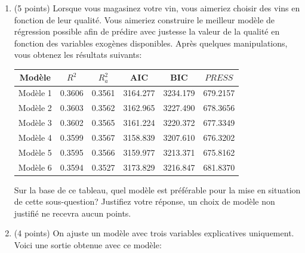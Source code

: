 \documentclass[11pt]{article}
\begin{document}
{\begin{enumerate}
\begin{enumerate}
    \begin{enumerate}
        \item Est-ce que cette observation fait augmenter ou diminuer la variance du vecteur de coefficients de régression estimés?\vspace{2.5in}
        \item Est-ce que la présence de cette observation fait augmenter ou diminuer la valeur de sa propre prédiction? Quantifiez cette augmentation ou diminution.\vspace{2in}
    \end{enumerate}
    \newpage
    \item (5 points) Lorsque vous magasinez votre vin, vous aimeriez choisir des vins en fonction de leur qualité. Vous aimeriez construire le meilleur modèle de régression possible afin de prédire avec justesse la valeur de la qualité en fonction des variables exogènes disponibles. Après quelques manipulations, vous obtenez les résultats suivants:
	\begin{center}\begin{tabular}{|c|c|c|c|c|c|}\hline
		Mod\`ele & $R^2$ & $R_{a}^2$ & AIC & BIC & $PRESS$\\ \hline\hline
		Modèle 1 & 0.3606 & 0.3561 & 3164.277 & 3234.179 & 679.2157 \\\hline
            Modèle 2 & 0.3603 & 0.3562 & 3162.965 & 3227.490 & 678.3656 \\\hline
            Modèle 3 & 0.3602 & 0.3565 & 3161.224 & 3220.372 & 677.3349 \\\hline
            Modèle 4 & 0.3599 & 0.3567 & 3158.839 & 3207.610 & 676.3202 \\\hline
            Modèle 5 & 0.3595 & 0.3566 & 3159.977 & 3213.371 & 675.8162 \\\hline
            Modèle 6 & 0.3594 & 0.3527 & 3173.829 & 3216.847 & 681.8370 \\\hline
	\end{tabular}\end{center}
    Sur la base de ce tableau, quel modèle est préférable pour la mise en situation de cette sous-question? Justifiez votre réponse, un choix de modèle non justifié ne recevra aucun points. 
    \vspace{2in}
    \item (4 points) On ajuste un modèle avec trois variables explicatives uniquement. Voici une sortie obtenue avec ce modèle:

\end{enumerate}
\end{enumerate}}
\end{document}

